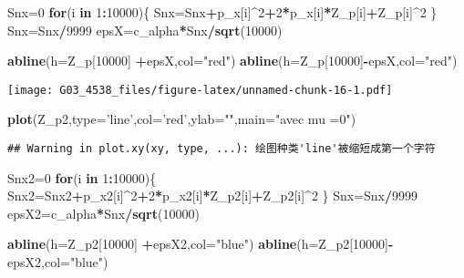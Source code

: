 \documentclass[]{article}
\newenvironment{Shaded}{\begin{snugshade}}{\end{snugshade}}
\newcommand{\KeywordTok}[1]{\textcolor[rgb]{0.13,0.29,0.53}{\textbf{#1}}}
\newcommand{\DataTypeTok}[1]{\textcolor[rgb]{0.13,0.29,0.53}{#1}}
\newcommand{\DecValTok}[1]{\textcolor[rgb]{0.00,0.00,0.81}{#1}}
\newcommand{\StringTok}[1]{\textcolor[rgb]{0.31,0.60,0.02}{#1}}
\newcommand{\ControlFlowTok}[1]{\textcolor[rgb]{0.13,0.29,0.53}{\textbf{#1}}}
\newcommand{\OperatorTok}[1]{\textcolor[rgb]{0.81,0.36,0.00}{\textbf{#1}}}
\newcommand{\NormalTok}[1]{#1}
\begin{document}
\begin{Shaded}
\begin{Highlighting}[]
\NormalTok{Snx=}\DecValTok{0}  
\ControlFlowTok{for}\NormalTok{(i }\ControlFlowTok{in} \DecValTok{1}\OperatorTok{:}\DecValTok{10000}\NormalTok{)\{}
\NormalTok{  Snx=Snx}\OperatorTok{+}\NormalTok{p_x[i]}\OperatorTok{^}\DecValTok{2}\OperatorTok{+}\DecValTok{2}\OperatorTok{*}\NormalTok{p_x[i]}\OperatorTok{*}\NormalTok{Z_p[i]}\OperatorTok{+}\NormalTok{Z_p[i]}\OperatorTok{^}\DecValTok{2}
\NormalTok{\}}
\NormalTok{Snx=Snx}\OperatorTok{/}\DecValTok{9999}
\NormalTok{epsX=c_alpha}\OperatorTok{*}\NormalTok{Snx}\OperatorTok{/}\KeywordTok{sqrt}\NormalTok{(}\DecValTok{10000}\NormalTok{)}

\KeywordTok{abline}\NormalTok{(}\DataTypeTok{h=}\NormalTok{Z_p[}\DecValTok{10000}\NormalTok{] }\OperatorTok{+}\NormalTok{epsX,}\DataTypeTok{col=}\StringTok{"red"}\NormalTok{)}
\KeywordTok{abline}\NormalTok{(}\DataTypeTok{h=}\NormalTok{Z_p[}\DecValTok{10000}\NormalTok{]}\OperatorTok{-}\NormalTok{epsX,}\DataTypeTok{col=}\StringTok{"red"}\NormalTok{)}
\end{Highlighting}
\end{Shaded}

\texttt{[image: G03\_4538\_files/figure-latex/unnamed-chunk-16-1.pdf]}

\begin{Shaded}
\begin{Highlighting}[]
\KeywordTok{plot}\NormalTok{(Z_p2,}\DataTypeTok{type=}\StringTok{'line'}\NormalTok{,}\DataTypeTok{col=}\StringTok{'red'}\NormalTok{,}\DataTypeTok{ylab=}\StringTok{""}\NormalTok{,}\DataTypeTok{main=}\StringTok{"avec mu =0"}\NormalTok{)}
\end{Highlighting}
\end{Shaded}

\begin{verbatim}
## Warning in plot.xy(xy, type, ...): 绘图种类'line'被缩短成第一个字符
\end{verbatim}

\begin{Shaded}
\begin{Highlighting}[]
\NormalTok{Snx2=}\DecValTok{0}  
\ControlFlowTok{for}\NormalTok{(i }\ControlFlowTok{in} \DecValTok{1}\OperatorTok{:}\DecValTok{10000}\NormalTok{)\{}
\NormalTok{  Snx2=Snx2}\OperatorTok{+}\NormalTok{p_x2[i]}\OperatorTok{^}\DecValTok{2}\OperatorTok{+}\DecValTok{2}\OperatorTok{*}\NormalTok{p_x2[i]}\OperatorTok{*}\NormalTok{Z_p2[i]}\OperatorTok{+}\NormalTok{Z_p2[i]}\OperatorTok{^}\DecValTok{2}
\NormalTok{\}}
\NormalTok{Snx=Snx}\OperatorTok{/}\DecValTok{9999}
\NormalTok{epsX2=c_alpha}\OperatorTok{*}\NormalTok{Snx}\OperatorTok{/}\KeywordTok{sqrt}\NormalTok{(}\DecValTok{10000}\NormalTok{)}

\KeywordTok{abline}\NormalTok{(}\DataTypeTok{h=}\NormalTok{Z_p2[}\DecValTok{10000}\NormalTok{] }\OperatorTok{+}\NormalTok{epsX2,}\DataTypeTok{col=}\StringTok{"blue"}\NormalTok{)}
\KeywordTok{abline}\NormalTok{(}\DataTypeTok{h=}\NormalTok{Z_p2[}\DecValTok{10000}\NormalTok{]}\OperatorTok{-}\NormalTok{epsX2,}\DataTypeTok{col=}\StringTok{"blue"}\NormalTok{)}
\end{Highlighting}
\end{Shaded}
\end{document}
